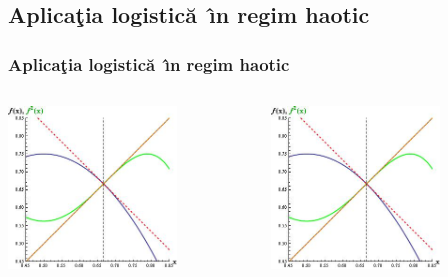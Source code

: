 \documentclass[a4,compress,handout]{beamer}
\newcommand{\ab}{\u{a}}
\newcommand{\ib}{\^{\i}}
\newcommand{\tb}{\c{t}}
\begin{document}
\subsection[Aplica\tb ia]{Aplica\tb ia logistic\ab\ \ib n regim haotic}
\begin{frame}
	\frametitle{Aplica\tb ia logistic\ab\ \ib n regim haotic}
		\begin{columns}[c]
			\begin{column}{0.5\textwidth}
				\hfill\includegraphics[width=0.7\textwidth]{229a.jpg}\hspace*{\fill}
				
				
			\end{column}
			\begin{column}{0.5\textwidth}
				\hfill\includegraphics[width=0.7\textwidth]{229a.jpg}\hspace*{\fill}
				

\end{column}
\end{columns}
\end{frame}
\end{document}
